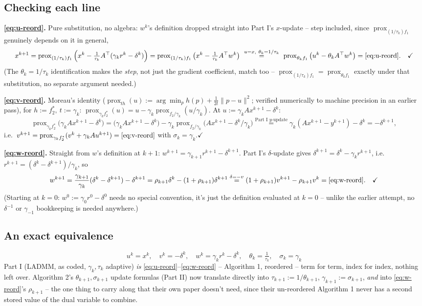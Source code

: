 \documentclass[11pt]{article}
\newcommand{\prox}{\operatorname{prox}}
\begin{document}
\subsection*{Checking each line}
\textbf{\eqref{eq:u-reord}.} Pure substitution, no algebra: $w^k$'s definition dropped
straight into Part I's $x$-update -- step included, since $\prox_{(1/\tau_k)f_1}$
genuinely depends on it in general,
\[
x^{k+1}=\prox_{(1/\tau_k)f_1}\Big(x^k-\tfrac1{\tau_k}A^\top(\gamma_kr^k-\delta^k)\Big)
=\prox_{(1/\tau_k)f_1}\big(x^k-\tfrac1{\tau_k}A^\top w^k\big)
\ \overset{u=x,\ \theta_k=1/\tau_k}{=}\ \prox_{\theta_kf_1}\big(u^k-\theta_kA^\top w^k\big)
=\eqref{eq:u-reord}.\quad\checkmark
\]
(The $\theta_k=1/\tau_k$ identification makes the \emph{step}, not just the gradient
coefficient, match too -- $\prox_{(1/\tau_k)f_1}=\prox_{\theta_kf_1}$ exactly under that
substitution, no separate argument needed.)

\textbf{\eqref{eq:v-reord}.} Moreau's identity ($\prox_{th}(u):=\arg\min_p h(p)+\tfrac1{2t}\|p-u\|^2$;
verified numerically to machine precision in an earlier pass), for $h:=f_2^*,\ t:=\gamma_k$:
$\prox_{\gamma_kf_2^*}(u)=u-\gamma_k\prox_{f_2/\gamma_k}(u/\gamma_k)$. At
$u:=\gamma_kAx^{k+1}-\delta^k$:
\[
\prox_{\gamma_kf_2^*}\big(\gamma_kAx^{k+1}-\delta^k\big)
=\big(\gamma_kAx^{k+1}-\delta^k\big)-\gamma_k\prox_{f_2/\gamma_k}\big(Ax^{k+1}-\delta^k/\gamma_k\big)
\overset{\text{Part I }y\text{-update}}{=}\gamma_k(Ax^{k+1}-y^{k+1})-\delta^k=-\delta^{k+1},
\]
i.e.\ $v^{k+1}=\prox_{\gamma_kf_2^*}(v^k+\gamma_kAu^{k+1})=\eqref{eq:v-reord}$ with
$\sigma_k=\gamma_k$.\quad$\checkmark$

\textbf{\eqref{eq:w-reord}.} Straight from $w$'s definition at $k+1$:
$w^{k+1}=\gamma_{k+1}r^{k+1}-\delta^{k+1}$. Part I's $\delta$-update gives
$\delta^{k+1}=\delta^k-\gamma_kr^{k+1}$, i.e.\ $r^{k+1}=(\delta^k-\delta^{k+1})/\gamma_k$, so
\[
w^{k+1}=\frac{\gamma_{k+1}}{\gamma_k}(\delta^k-\delta^{k+1})-\delta^{k+1}
=\rho_{k+1}\delta^k-(1+\rho_{k+1})\delta^{k+1}
\overset{\delta=-v}{=}(1+\rho_{k+1})v^{k+1}-\rho_{k+1}v^k=\eqref{eq:w-reord}.\quad\checkmark
\]
(Starting at $k=0$: $w^0:=\gamma_0r^0-\delta^0$ needs no special convention, it's just
the definition evaluated at $k=0$ -- unlike the earlier attempt, no $\delta^{-1}$ or
$\gamma_{-1}$ bookkeeping is needed anywhere.)

\subsection*{An exact equivalence}
\[
\boxed{u^k=x^k,\quad v^k=-\delta^k,\quad w^k=\gamma_kr^k-\delta^k,\quad
\theta_k=\tfrac1{\tau_k},\quad\sigma_k=\gamma_k}
\]
Part I (LADMM, as coded, $\gamma_k,\tau_k$ adaptive) \emph{is}
\eqref{eq:u-reord}--\eqref{eq:w-reord} -- Algorithm 1, reordered -- term for term, index
for index, nothing left over. Algorithm 2's $\theta_{k+1},\sigma_{k+1}$ update formulas
(Part II) now translate directly into $\tau_{k+1}:=1/\theta_{k+1}$,
$\gamma_{k+1}:=\sigma_{k+1}$, \emph{and} into \eqref{eq:w-reord}'s $\rho_{k+1}$ -- the
one thing to carry along that their own paper doesn't need, since their un-reordered
Algorithm 1 never has a second stored value of the dual variable to combine.
\end{document}
